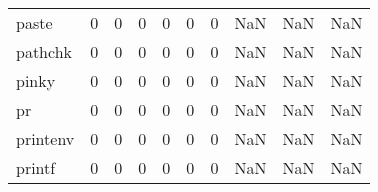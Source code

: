 \begin{longtable}{lrrrrrrrrr}
paste     &                                       0 &                                                  0 &                                                  0 &                                                  0 &                                                  0 &                                                  0 &                                                NaN &                                    NaN &                                  NaN \\
pathchk   &                                       0 &                                                  0 &                                                  0 &                                                  0 &                                                  0 &                                                  0 &                                                NaN &                                    NaN &                                  NaN \\
pinky     &                                       0 &                                                  0 &                                                  0 &                                                  0 &                                                  0 &                                                  0 &                                                NaN &                                    NaN &                                  NaN \\
pr        &                                       0 &                                                  0 &                                                  0 &                                                  0 &                                                  0 &                                                  0 &                                                NaN &                                    NaN &                                  NaN \\
printenv  &                                       0 &                                                  0 &                                                  0 &                                                  0 &                                                  0 &                                                  0 &                                                NaN &                                    NaN &                                  NaN \\
printf    &                                       0 &                                                  0 &                                                  0 &                                                  0 &                                                  0 &                                                  0 &                                                NaN &                                    NaN &                                  NaN \\

\end{longtable}

